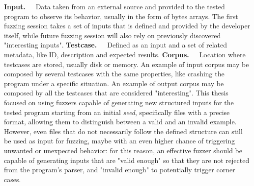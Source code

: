 \newline \newline
\textbf{Input.}\ \ \ Data taken from an external source and provided to the tested program to observe its behavior, usually in the form of bytes arrays. The first fuzzing session takes a set of inputs that is defined and provided by the developer itself, while future fuzzing session will also rely on previously discovered "interesting inputs". 
\newline \newline
\textbf{Testcase.}\ \ \ Defined as an input and a set of related metadata, like ID, description and expected results.
\newline \newline
\textbf{Corpus.}\ \ \ Location where testcases are stored, usually disk or memory. An example of input corpus may be composed by several testcases with the same properties, like crashing the program under a specific situation. An example of output corpus may be composed by all the testcases that are considered "interesting".
\newline \newline \newline
This thesis focused on using fuzzers capable of generating new structured inputs for the tested program starting from an initial \textit{seed}, specifically files with a precise format, allowing them to distinguish between a valid and an invalid example. 
\newline
However, even files that do not necessarily follow the defined structure can still be used as input for fuzzing, maybe with an even higher chance of triggering unwanted or unexpected behavior: for this reason, an effective fuzzer should be capable of generating inputs that are "valid enough" so that they are not rejected from the program's parser, and "invalid enough" to potentially trigger corner cases.


